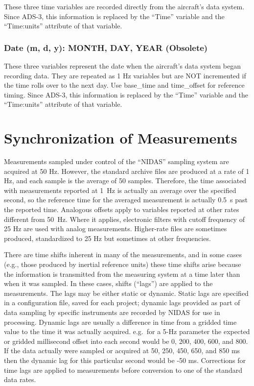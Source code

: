 \documentclass[
  english,
]{book}
\begin{document}
These three time variables are recorded directly from the aircraft's data system. Since ADS-3, this information is replaced by the ``Time'' variable and the ``Time:units'' attribute of that variable.

\hypertarget{mdy}{%
\subsubsection*{Date (m, d, y): MONTH, DAY, YEAR (Obsolete)}\label{mdy}}

These three variables represent the date when the aircraft's data system began recording data. They are repeated as 1 Hz variables but are NOT incremented if the time rolls over to the next day. Use base\_time and time\_offset for reference timing. Since ADS-3, this information is replaced by the ``Time'' variable and the ``Time:units'' attribute of that variable.

\hypertarget{synchronication-of-measurements}{%
\section{Synchronization of Measurements}\label{synchronication-of-measurements}}

Measurements sampled under control of the ``NIDAS'' sampling system are acquired at 50 Hz. However, the standard archive files are produced at a rate of 1 Hz, and each sample is the average of 50 samples. Therefore, the time associated with measurements reported at 1~Hz is actually an average over the specified second, so the reference time for the averaged measurement is actually 0.5~s past the reported time. Analogous offsets apply to variables reported at other rates different from 50~Hz. Where it applies, electronic filters with cutoff frequency of 25 Hz are used with analog measurements. Higher-rate files are sometimes produced, standardized to 25 Hz but sometimes at other frequencies.

There are time shifts inherent in many of the measurements, and in some cases (e.g., those produced by inertial reference units) these time shifts arise because the information is transmitted from the measuring system at a time later than when it was sampled. In these cases, shifts (``lags'') are applied to the measurements. The lags may be either static or dynamic. Static lags are specified in a configuration file, saved for each project; dynamic lags provided as part of data sampling by specific instruments are recorded by NIDAS for use in processing. Dynamic lags are usually a difference in time from a gridded time value to the time it was actually acquired. e.g.~for a 5-Hz parameter the expected or gridded millisecond offset into each second would be 0, 200, 400, 600, and 800. If the data actually were sampled or acquired at 50, 250, 450, 650, and 850 ms then the dynamic lag for this particular second would be -50 ms. Corrections for time lags are applied to measurements before conversion to one of the standard data rates.
\end{document}
